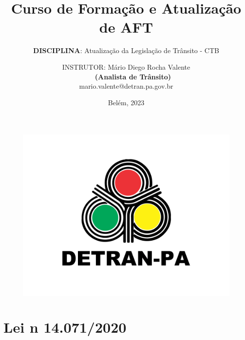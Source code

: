 \documentclass{beamer}
\author{INSTRUTOR: Mário Diego Rocha Valente \\
 \ \ \ \  \textbf{(Analista de Trânsito)} \\
 mario.valente@detran.pa.gov.br
 }
\title{\textbf{Curso de Formação e Atualização de AFT} }
\subtitle{\textbf{DISCIPLINA}: Atualização da  Legislação de Trânsito - CTB}
\institute{
Coordenadoria de Gestão e Recursos Humansos \\
    Gerência de Treinamento}
\date{Belém, 2023}
\begin{document}
\begin{frame}
 \titlepage
\begin{figure}[htpb]
\begin{center}
\vspace{-1.3cm}
\includegraphics[keepaspectratio, scale=0.07]{pic/detran2.png}
\end{center}
 \end{figure}
\end{frame}
\begin{frame}
    \tableofcontents[sectionstyle=show,subsectionstyle=show/shaded/hide,subsubsectionstyle=show/shaded/hide]
\end{frame}


\section{Lei n 14.071/2020}
\end{document}
